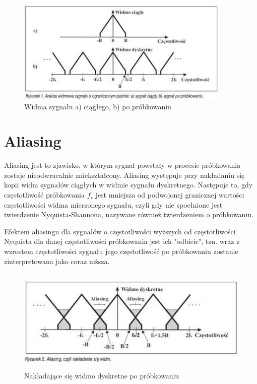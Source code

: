 \documentclass[a4paper,12pt]{extarticle}
\begin{document}
\begin{figure}[h]
\includegraphics[height=5cm]{WidmaPor.jpg}
\centering
\caption{Widma sygnału a) ciągłego, b) po próbkowaniu \cite{JanErhard}}
\end{figure}

\newpage

\section*{Aliasing}

Aliasing jest to zjawisko, w którym sygnał powstały w procesie próbkowania zostaje nieodwracalnie zniekształcony. Aliasing występuje przy nakładaniu się kopii widm sygnałów ciągłych w widmie sygnału dyskretnego. Następuje to, gdy częstotliwość próbkowania \(f_s\) jest mniejsza od podwojonej granicznej wartości częstotliwości widma mierzonego sygnału, czyli gdy nie spoełnione jest twierdzenie Nyquista-Shannona, nazywane również twierdzeniem o próbkowaniu.

Efektem aliasingu dla sygnałów o częstotliwości wyższych od częstotliwości Nyquista dla danej częstotliwości próbkowania jest ich "odbicie", tzn. wraz z wzrostem częstotliwości sygnału jego częstotliwość po próbkowaniu zostanie zinterpretowana jako coraz niższa.

\begin{figure}[h]
\includegraphics[height=5cm]{NachodzWidma.jpg}
\centering
\caption{Nakładające się widmo dyskretne po próbkowaniu \cite{JanErhard}}
\end{figure}
\end{document}

